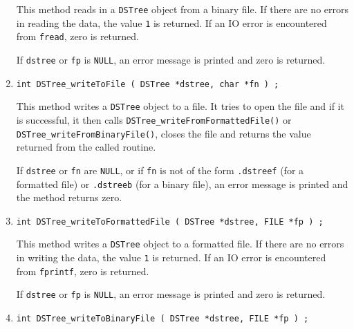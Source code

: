\begin{enumerate}
\par
This method reads in a {\tt DSTree} object from a binary file.
If there are no errors in reading the data, 
the value {\tt 1} is returned.
If an IO error is encountered from {\tt fread}, zero is returned.
\par {}
If {\tt dstree} or {\tt fp} is {\tt NULL}, 
an error message is printed and zero is returned.
\item
\begin{verbatim}
int DSTree_writeToFile ( DSTree *dstree, char *fn ) ;
\end{verbatim}
\par
This method writes a {\tt DSTree} object to a file.
It tries to open the file and if it is successful, 
it then calls {\tt DSTree\_writeFromFormattedFile()} or
{\tt DSTree\_writeFromBinaryFile()},
closes the file
and returns the value returned from the called routine.
\par {}
If {\tt dstree} or {\tt fn} are {\tt NULL}, 
or if {\tt fn} is not of the form
{\tt *.dstreef} (for a formatted file) 
or {\tt *.dstreeb} (for a binary file),
an error message is printed and the method returns zero.
\item
\begin{verbatim}
int DSTree_writeToFormattedFile ( DSTree *dstree, FILE *fp ) ;
\end{verbatim}
\par
This method writes a {\tt DSTree} object to a formatted file.
If there are no errors in writing the data, 
the value {\tt 1} is returned.
If an IO error is encountered from {\tt fprintf}, zero is returned.
\par {}
If {\tt dstree} or {\tt fp} is {\tt NULL}, 
an error message is printed and zero is returned.
\item
\begin{verbatim}
int DSTree_writeToBinaryFile ( DSTree *dstree, FILE *fp ) ;
\end{verbatim}
\par

\end{enumerate}
